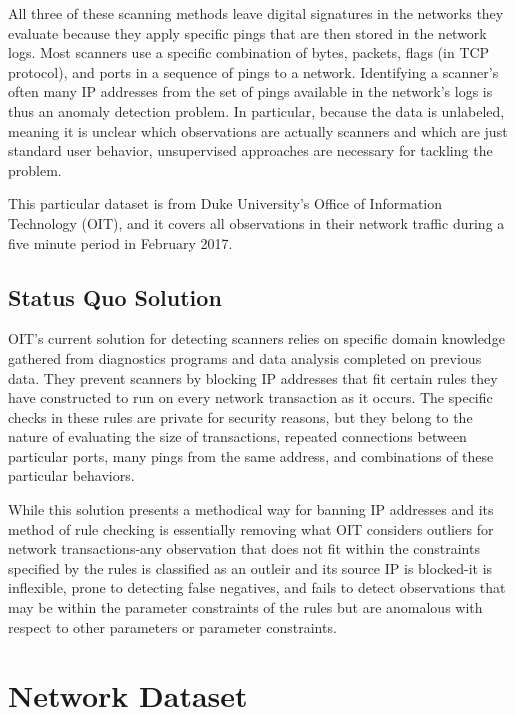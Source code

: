 \documentclass[12pt,twoside]{dukestatscithesis}
\theoremstyle{definition}
\theoremstyle{definition}
\theoremstyle{definition}
\theoremstyle{remark}
\begin{document}
All three of these scanning methods leave digital signatures in the
networks they evaluate because they apply specific pings that are then
stored in the network logs. Most scanners use a specific combination of
bytes, packets, flags (in TCP protocol), and ports in a sequence of
pings to a network. Identifying a scanner's often many IP addresses from
the set of pings available in the network's logs is thus an anomaly
detection problem. In particular, because the data is unlabeled, meaning
it is unclear which observations are actually scanners and which are
just standard user behavior, unsupervised approaches are necessary for
tackling the problem.

This particular dataset is from Duke University's Office of Information
Technology (OIT), and it covers all observations in their network
traffic during a five minute period in February 2017.

\subsection{Status Quo Solution}\label{status-quo-solution}

OIT's current solution for detecting scanners relies on specific domain
knowledge gathered from diagnostics programs and data analysis completed
on previous data. They prevent scanners by blocking IP addresses that
fit certain rules they have constructed to run on every network
transaction as it occurs. The specific checks in these rules are private
for security reasons, but they belong to the nature of evaluating the
size of transactions, repeated connections between particular ports,
many pings from the same address, and combinations of these particular
behaviors.

While this solution presents a methodical way for banning IP addresses
and its method of rule checking is essentially removing what OIT
considers outliers for network transactions-any observation that does
not fit within the constraints specified by the rules is classified as
an outleir and its source IP is blocked-it is inflexible, prone to
detecting false negatives, and fails to detect observations that may be
within the parameter constraints of the rules but are anomalous with
respect to other parameters or parameter constraints.

\section{Network Dataset}\label{network-dataset}
\end{document}
